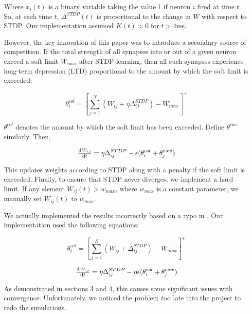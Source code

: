 Where \(x_i(t)\) is a binary variable taking the value 1 if neuron \(i\) fired at time \(t\). So, at each time \(t\), \(\Delta^{STDP}(t)\) is proportional to the change in \(W\) with respect to STDP. Our implementation assumed \(K(t) \approx 0\) for \(t > 4\)ms.

However, the key innovation of this paper was to introduce a secondary source of competition. If the total strength of all synapses into or out of a given neuron exceed a soft limit \(W_{max}\) after STDP learning, then all such synapses experience long-term depression (LTD) proportional to the amount by which the soft limit is exceeded:

\begin{equation}
\theta^{col}_i =  \left[\sum_{j=1}^N (W_{ij} + \eta\Delta^{STDP}_{ij}) - W_{max}\right]^+
\label{hLTP}
\end{equation}

\(\theta^{col}\) denotes the amount by which the soft limit has been exceeded. Define \(\theta^{row}\) similarly. Then,

\begin{equation}
\od{W_{ij}}{t} = \eta\Delta^{STDP}_{ij} - \epsilon(\theta^{col}_i + \theta^{row}_j)
\label{Learning}
\end{equation}

This updates weights according to STDP along with a penalty if the soft limit is exceeded. Finally, to ensure that STDP never diverges, we implement a hard limit. If any element \(W_{ij}(t) > w_{max}\), where \(w_{max}\) is a constant parameter, we manually set \(W_{ij}(t)\) to \(w_{max}\). 

We actually implemented the results incorrectly based on a typo in \cite{Fiete}. Our implementation used the following equations:

\begin{equation}
\theta^{col}_i =  \left[\sum_{j=1}^N (W_{ij} + \Delta^{STDP}_{ij}) - W_{max}\right]^+
\label{hLTP-wrong}
\end{equation}

\begin{equation}
\od{W_{ij}}{t} = \eta\Delta^{STDP}_{ij} - \eta\epsilon(\theta^{col}_i + \theta^{row}_j)
\label{Learning-wrong}
\end{equation}

As demonstrated in sections 3 and 4, this causes some significant issues with convergence. Unfortunately, we noticed the problem too late into the project to redo the simulations.

